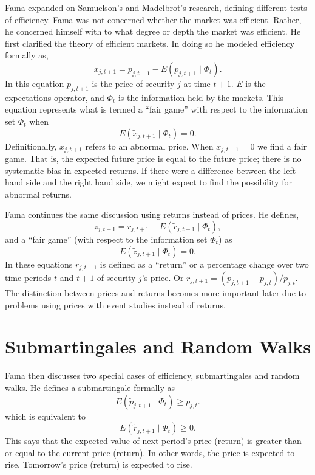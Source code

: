 Fama \cite{fama70}
expanded on Samuelson's and Madelbrot's research, defining
different tests of efficiency.  Fama was not concerned
whether the market was efficient.  Rather, he
concerned himself with to what degree or depth the market
was efficient. He first clarified the theory of
efficient markets.  In doing so he modeled efficiency
formally as,
\begin{equation}
x_{j,t+1}=p_{j,t+1}-E(p_{j,t+1} \mid \Phi_{t}).
\end{equation}
In this equation $p_{j,t+1}$
is the price of security $j$ at time $t+1$.  $E$ is
the expectations operator, and $\Phi_{t}$
is the information held by
the markets.  This equation 
represents what is termed a  ``fair game'' with respect to the
information set $\Phi_{t}$ when
\begin{equation}
E(\tilde x_{j,t+1} \mid \Phi_{t})=0.
\end{equation}
Definitionally, $x_{j,t+1}$
refers to an abnormal price.  When $x_{j,t+1}=0$ we find a
fair game.  That is, the
expected future price is
equal to the future price; there is no systematic bias in expected
returns.
If there were a difference between the left hand side and
the right hand side, we might expect to find the possibility
for abnormal returns.

Fama continues the same discussion using returns instead of
prices.  He defines,
\begin{equation}
z_{j,t+1}=r_{j,t+1}-E(\tilde r_{j,t+1} \mid \Phi_{t}),
\end{equation}
and a ``fair game'' (with respect to the information set
$\Phi_{t}$) as
\begin{equation}
E(\tilde z_{j,t+1} \mid \Phi_{t}) = 0.
\end{equation}
In these equations $r_{j,t+1}$ is defined as a ``return'' or a
percentage
change over two time periods $t$ and $t+1$ of security $j$'s price. 
Or $r_{j,t+1} = (p_{j,t+1}-p_{j,t})/p_{j,t}$.  The distinction
between prices and returns becomes more important later 
due to problems using prices with event studies instead of
returns.

\section{Submartingales and Random Walks}

Fama then discusses two special cases of efficiency,
submartingales and random walks. He defines a submartingale
formally
as
\begin{equation}
E(\tilde p_{j,t+1} \mid \Phi_{t}) \geq p_{j,t}.
\end{equation}
which is equivalent to
\begin{equation}
E(\tilde r_{j,t+1} \mid \Phi_{t}) \geq 0.
\end{equation}
This says that the expected value of next period's price (return) 
is greater than or equal to the current price (return).  In
other words, the price is expected to rise.  Tomorrow's price
(return) is expected to rise.

